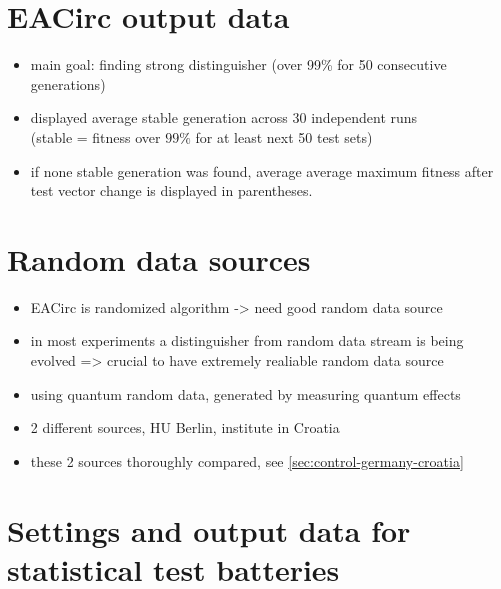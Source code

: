 \documentclass[12pt,oneside]{fithesis2}
\begin{document}
\section{EACirc output data}
\label{sec:settings-eacirc-output}

\begin{itemize}
\item main goal: finding strong distinguisher (over 99\% for 50 consecutive generations)
\item displayed average stable generation across 30 independent runs \\
(stable = fitness over $99\%$ for at least next 50 test sets)
\item if none stable generation was found, average average maximum fitness after test vector change is displayed in parentheses.
\end{itemize}

\section{Random data sources}
\label{sec:settings-random}

\begin{itemize}
\item EACirc is randomized algorithm -> need good random data source
\item in most experiments a distinguisher from random data stream is being evolved => crucial to have extremely realiable random data source
\item using quantum random data, generated by measuring quantum effects
\item 2 different sources, HU Berlin, institute in Croatia
\item these 2 sources thoroughly compared, see \autoref{sec:control-germany-croatia}
\end{itemize}

\section{Settings and output data for statistical test batteries}
\label{sec:settings-statistics}
\end{document}
